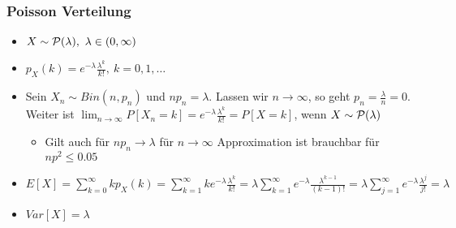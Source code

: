 \subsubsection{Poisson Verteilung}
\begin{itemize}
    \item $X \sim \mathcal{P}(\lambda), \ \lambda \in (0, \infty)$
    \item $p_X(k) = e^{-\lambda} \frac{\lambda^k}{k!}, \ k = 0, 1, \dots$
    \item Sein $X_n \sim Bin(n, p_n)$ und $np_n = \lambda$. Lassen wir $n \to \infty$, so geht $p_n = \frac{\lambda}{n} = 0$. Weiter ist $\lim_{n \to \infty} P[X_n = k] = e^{-\lambda} \frac{\lambda^k}{k!} = P[X = k]$, wenn $X \sim \mathcal{P}(\lambda)$
        \begin{itemize}
            \item Gilt auch für $np_n \to \lambda$ für $n \to \infty$
             Approximation ist brauchbar für $np^2 \le 0.05$
        \end{itemize}
    \item $E[X] = \sum_{k=0}^{\infty} kp_X(k) = \sum_{k=1}^{\infty} ke^{-\lambda} \frac{\lambda^k}{k!} = \lambda \sum_{k=1}^{\infty} e^{-\lambda} \frac{\lambda^{k - 1}}{(k - 1)!} = \lambda \sum_{j=1}^{\infty} e^{-\lambda} \frac{\lambda^j}{j!} = \lambda$
    \item $Var[X] = \lambda$
\end{itemize}
